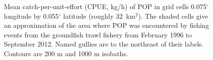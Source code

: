 
  


\clearpage




\begin{figure}[htp]
\begin{center}
\epsfxsize=6in
\end{center}
\vspace{-17mm}
\caption{Mean catch-per-unit-effort (CPUE, kg/h) of POP in grid cells 0.075$^\circ$ longitude by 0.055$^\circ$ latitude (roughly 32~km$^2$). The shaded cells give an approximation of the area where POP was encountered by fishing events from the groundfish trawl fishery from February 1996 to September 2012. Named gullies are to the northeast of their labels. Contours are 200 m and 1000 m isobaths.}
\label{fig:cpue} 
\end{figure}




